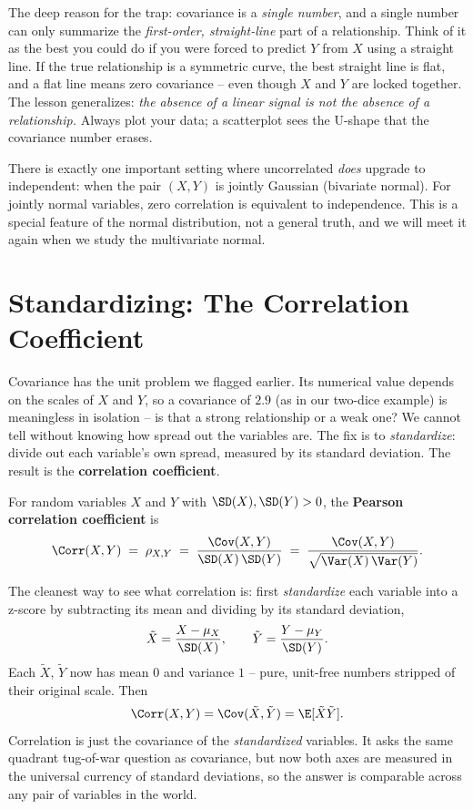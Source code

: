 \begin{happeningbox}
The deep reason for the trap: covariance is a \emph{single number}, and a single
number can only summarize the \emph{first-order, straight-line} part of a
relationship. Think of it as the best you could do if you were forced to predict
$Y$ from $X$ using a straight line. If the true relationship is a symmetric curve,
the best straight line is flat, and a flat line means zero covariance -- even though
$X$ and $Y$ are locked together. The lesson generalizes: \emph{the absence of a
linear signal is not the absence of a relationship.} Always plot your data; a
scatterplot sees the U-shape that the covariance number erases.
\end{happeningbox}

There is exactly one important setting where uncorrelated \emph{does} upgrade to
independent: when the pair $(X, Y)$ is jointly Gaussian (bivariate normal). For
jointly normal variables, zero correlation is equivalent to independence. This is a
special feature of the normal distribution, not a general truth, and we will meet it
again when we study the multivariate normal.

\section{Standardizing: The Correlation Coefficient}
\label{ch14:correlation}

Covariance has the unit problem we flagged earlier. Its numerical value depends on
the scales of $X$ and $Y$, so a covariance of $2.9$ (as in our two-dice example)
is meaningless in isolation -- is that a strong relationship or a weak one? We
cannot tell without knowing how spread out the variables are. The fix is to
\emph{standardize}: divide out each variable's own spread, measured by its standard
deviation. The result is the \textbf{correlation coefficient}.

\begin{definition}
\label{ch14:def-corr}
For random variables $X$ and $Y$ with $\SD(X), \SD(Y) > 0$, the \textbf{Pearson
correlation coefficient} is
\[
\Corr(X, Y) \;=\; \rho_{X,Y} \;=\;
\frac{\Cov(X, Y)}{\SD(X)\,\SD(Y)}
\;=\;
\frac{\Cov(X, Y)}{\sqrt{\Var(X)\,\Var(Y)}}.
\]
\end{definition}

\begin{intuitionbox}
The cleanest way to see what correlation is: first \emph{standardize} each variable
into a z-score by subtracting its mean and dividing by its standard deviation,
\[
\tilde X = \frac{X - \mu_X}{\SD(X)}, \qquad
\tilde Y = \frac{Y - \mu_Y}{\SD(Y)}.
\]
Each $\tilde X$, $\tilde Y$ now has mean $0$ and variance $1$ -- pure, unit-free
numbers stripped of their original scale. Then
\[
\Corr(X, Y) = \Cov(\tilde X, \tilde Y) = \E[\tilde X \tilde Y].
\]
Correlation is just the covariance of the \emph{standardized} variables. It asks
the same quadrant tug-of-war question as covariance, but now both axes are measured
in the universal currency of standard deviations, so the answer is comparable across
any pair of variables in the world.
\end{intuitionbox}

